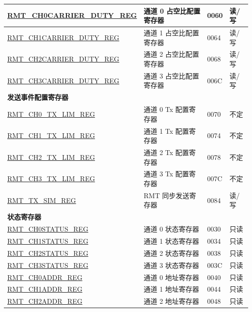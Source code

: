 \begin{longtable}{ | p{6cm} | p{6cm} | p{2cm} | p{1cm} | }
\hyperref[regdesc:RMTCHNCARRIERDUTYREG]{RMT\_CH0CARRIER\_DUTY\_REG} & 通道 0 占空比配置寄存器 & \hexprefix{}0060 & 读/写 \\ \hline
\hyperref[regdesc:RMTCHNCARRIERDUTYREG]{RMT\_CH1CARRIER\_DUTY\_REG} & 通道 1 占空比配置寄存器 & \hexprefix{}0064 & 读/写 \\ \hline
\hyperref[regdesc:RMTCHNCARRIERDUTYREG]{RMT\_CH2CARRIER\_DUTY\_REG} & 通道 2 占空比配置寄存器 & \hexprefix{}0068 & 读/写 \\ \hline
\hyperref[regdesc:RMTCHNCARRIERDUTYREG]{RMT\_CH3CARRIER\_DUTY\_REG} & 通道 3 占空比配置寄存器 & \hexprefix{}006C & 读/写 \\ \hline
\multicolumn{4}{|l|}{\textbf{发送事件配置寄存器}} \\ \hline
\hyperref[regdesc:RMTCHNTXLIMREG]{RMT\_CH0\_TX\_LIM\_REG} & 通道 0 Tx 配置寄存器 & \hexprefix{}0070 & 不定 \\ \hline
\hyperref[regdesc:RMTCHNTXLIMREG]{RMT\_CH1\_TX\_LIM\_REG} & 通道 1 Tx 配置寄存器 & \hexprefix{}0074 & 不定 \\ \hline
\hyperref[regdesc:RMTCHNTXLIMREG]{RMT\_CH2\_TX\_LIM\_REG} & 通道 2 Tx 配置寄存器 & \hexprefix{}0078 & 不定 \\ \hline
\hyperref[regdesc:RMTCHNTXLIMREG]{RMT\_CH3\_TX\_LIM\_REG} & 通道 3 Tx 配置寄存器 & \hexprefix{}007C & 不定 \\ \hline
\hyperref[regdesc:RMTTXSIMREG]{RMT\_TX\_SIM\_REG} & RMT 同步发送寄存器 & \hexprefix{}0084 & 读/写 \\ \hline
\multicolumn{4}{|l|}{\textbf{状态寄存器}} \\ \hline
\hyperref[regdesc:RMTCHNSTATUSREG]{RMT\_CH0STATUS\_REG} & 通道 0 状态寄存器 & \hexprefix{}0030 & 只读 \\ \hline
\hyperref[regdesc:RMTCHNSTATUSREG]{RMT\_CH1STATUS\_REG} & 通道 1 状态寄存器 & \hexprefix{}0034 & 只读 \\ \hline
\hyperref[regdesc:RMTCHNSTATUSREG]{RMT\_CH2STATUS\_REG} & 通道 2 状态寄存器 & \hexprefix{}0038 & 只读 \\ \hline
\hyperref[regdesc:RMTCHNSTATUSREG]{RMT\_CH3STATUS\_REG} & 通道 3 状态寄存器 & \hexprefix{}003C & 只读 \\ \hline
\hyperref[regdesc:RMTCHNADDRREG]{RMT\_CH0ADDR\_REG} & 通道 0 地址寄存器 & \hexprefix{}0040 & 只读 \\ \hline
\hyperref[regdesc:RMTCHNADDRREG]{RMT\_CH1ADDR\_REG} & 通道 1 地址寄存器 & \hexprefix{}0044 & 只读 \\ \hline
\hyperref[regdesc:RMTCHNADDRREG]{RMT\_CH2ADDR\_REG} & 通道 2 地址寄存器 & \hexprefix{}0048 & 只读 \\ \hline

\end{longtable}
